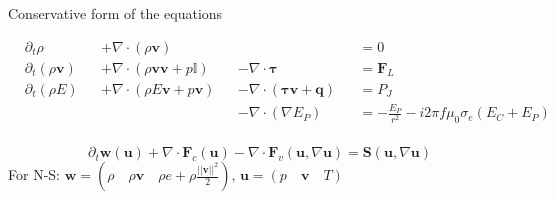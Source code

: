 \documentclass[24pt,t,table, aspectratio=169]{beamer}
\newcommand{\vecu}{\mathbf{u}}
\newcommand{\vecF}{\mathbf{F}}
\newcommand{\vecS}{\mathbf{S}}
\newcommand{\vecq}{\mathbf{q}}
\newcommand{\vecw}{\mathbf{w}}
\newcommand{\vectau}{\boldsymbol{\tau}}
\newcommand{\vecv}{\mathbf{v}}
\begin{document}
\begin{frame}{Conservative form of the equations}

\begin{framed}
\begin{equation*}
\begin{aligned}
& \partial_t \rho &&+ \nabla \cdot \left(\rho \vecv\right) && &&= 0\\
& \partial_t \left(\rho \vecv\right) &&+ \nabla \cdot \left(\rho \vecv \vecv + p \mathbb{I} \right) &&- \nabla \cdot \vectau &&= \vecF_L\\
& \partial_t \left(\rho E\right) &&+ \nabla \cdot \left(\rho E \vecv + p \vecv\right) &&- \nabla \cdot \left(\vectau\vecv + \vecq\right) &&= P_J\\
& && &&- \nabla \cdot \left(\nabla E_P\right) &&= -\frac{E_P}{r^2} - i 2 \pi f\mu_0\sigma_e \left(E_C + E_P\right)\\
\end{aligned}
\end{equation*}
\end{framed}

\begin{equation*}
\partial_t \vecw(\vecu) + \nabla \cdot \vecF_c(\vecu) - \nabla \cdot \vecF_v(\vecu, \nabla \vecu) = \vecS(\vecu, \nabla \vecu)
\end{equation*}
\vfill
For N-S: $\vecw = \left(\rho \quad \rho \vecv \quad \rho e + \rho \frac{||\vecv||^2}{2} \right)$, $\vecu = \left(p \quad \vecv \quad T \right)$
%



\end{frame}
\end{document}
